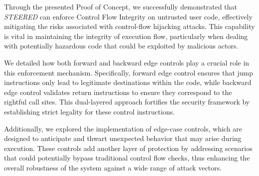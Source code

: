 Through the presented Proof of Concept, we successfully demonstrated that
\textit{STEERED} can enforce Control Flow Integrity on untrusted user code,
effectively mitigating the risks associated with control-flow hijacking attacks.
This capability is vital in maintaining the integrity of execution flow,
particularly when dealing with potentially hazardous code that could be
exploited by malicious actors.

We detailed how both forward and backward edge controls play a crucial role in
this enforcement mechanism. Specifically, forward edge control ensures that jump
instructions only lead to legitimate destinations within the code, while backward
edge control validates return instructions to ensure they correspond to the rightful
call sites. This dual-layered approach fortifies the security framework by
establishing strict legality for these control instructions.

Additionally, we explored the implementation of edge-case controls, which are
designed to anticipate and thwart unexpected behavior that may arise during
execution. These controls add another layer of protection by addressing scenarios
that could potentially bypass traditional control flow checks, thus enhancing
the overall robustness of the system against a wide range of attack vectors.